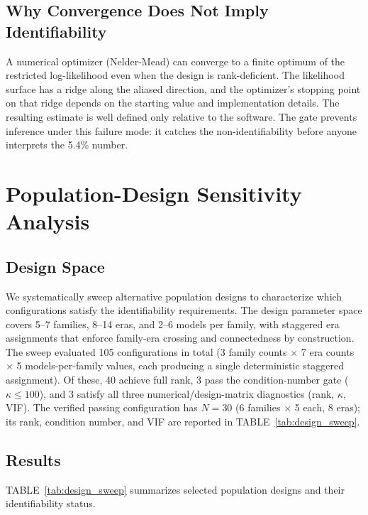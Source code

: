\documentclass{ieeeaccess}
\theoremstyle{definition}
\theoremstyle{plain}
\begin{document}
\subsection{Why Convergence Does Not Imply Identifiability}
A numerical optimizer (Nelder-Mead) can converge to a finite optimum of the restricted log-likelihood even when the design is rank-deficient. The likelihood surface has a ridge along the aliased direction, and the optimizer's stopping point on that ridge depends on the starting value and implementation details. The resulting estimate is well defined only relative to the software. The gate prevents inference under this failure mode: it catches the non-identifiability before anyone interprets the 5.4\% number.

\section{Population-Design Sensitivity Analysis}
\label{sec:sensitivity}

\subsection{Design Space}
We systematically sweep alternative population designs to characterize which configurations satisfy the identifiability requirements. The design parameter space covers 5--7 families, 8--14 eras, and 2--6 models per family, with staggered era assignments that enforce family-era crossing and connectedness by construction. The sweep evaluated 105 configurations in total (3 family counts $\times$ 7 era counts $\times$ 5 models-per-family values, each producing a single deterministic staggered assignment). Of these, 40 achieve full rank, 3 pass the condition-number gate ($\kappa \leq 100$), and 3 satisfy all three numerical/design-matrix diagnostics (rank, $\kappa$, VIF). The verified passing configuration has $N = 30$ (6 families $\times$ 5 each, 8 eras); its rank, condition number, and VIF are reported in TABLE~\ref{tab:design_sweep}.

\subsection{Results}
TABLE~\ref{tab:design_sweep} summarizes selected population designs and their identifiability status.
\end{document}
